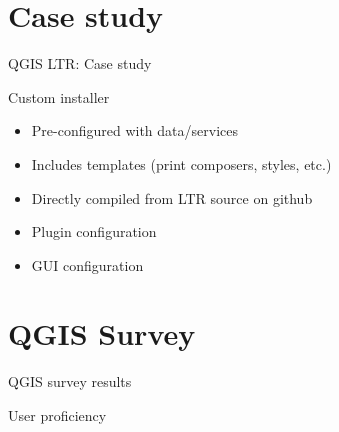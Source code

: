 \section{Case study}
\begin{frame}{QGIS LTR: Case study}
	\begin{block}{Custom installer}
		\begin{itemize}
			\item Pre-configured with data/services
			\item Includes templates (print composers, styles, etc.)
			\item Directly compiled from LTR source on github
			\item Plugin configuration
			\item GUI configuration
		\end{itemize}
	\end{block}
\end{frame}


\section{QGIS Survey}

\begin{frame}{QGIS survey results}
	\begin{block}{User proficiency}
	\end{block}
\end{frame}

